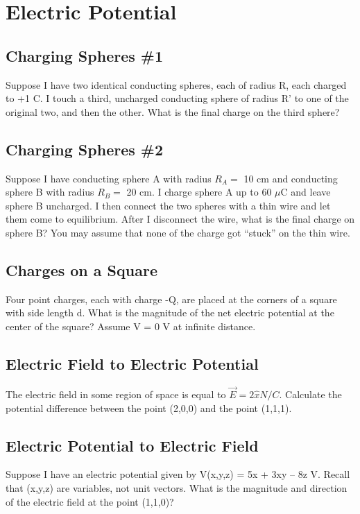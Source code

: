 \documentclass[11pt]{article}
\begin{document}

\pagebreak
\section{Electric Potential}

\subsection{Charging Spheres \#1}
Suppose I have two identical conducting spheres, each of radius R, each charged to +1 C.  I touch a third, uncharged conducting sphere of radius R' to one of the original two, and then the other.  What is the final charge on the third sphere?

\subsection{Charging Spheres \#2}
Suppose I have conducting sphere A with radius $R_A=$ 10 cm and conducting sphere B with radius $R_B=$ 20 cm.  I charge sphere A up to 60 $\mu$C and leave sphere B uncharged.  I then connect the two spheres with a thin wire and let them come to equilibrium.  After I disconnect the wire, what is the final charge on sphere B?  You may assume that none of the charge got “stuck” on the thin wire.

\subsection{Charges on a Square}
Four point charges, each with charge -Q, are placed at the corners of a square with side length d.  What is the magnitude of the net electric potential at the center of the square?  Assume V = 0 V at infinite distance.

\subsection{Electric Field to Electric Potential}
The electric field in some region of space is equal to $\vec{E} = 2 \hat{x} N/C$.  Calculate the potential difference between the point (2,0,0) and the point (1,1,1).

\subsection{Electric Potential to Electric Field}
Suppose I have an electric potential given by V(x,y,z) = 5x + 3xy – 8z V.  Recall that (x,y,z) are variables, not unit vectors.  What is the magnitude and direction of the electric field at the point (1,1,0)?
\end{document}
